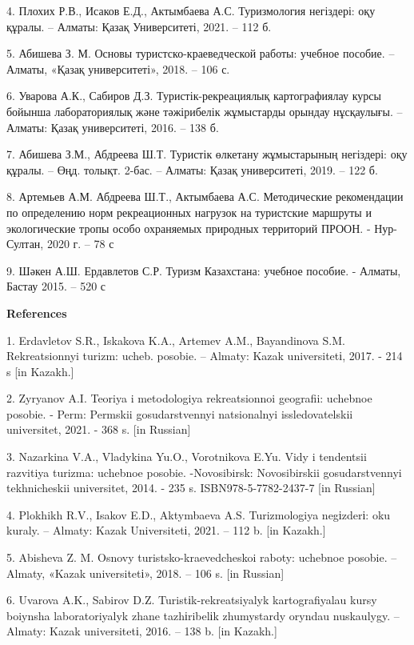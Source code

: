 4. Плохих Р.В., Исаков Е.Д., Актымбаева А.С. Туризмология негіздері: оқу
құралы. -- Алматы: Қазақ Университеті, 2021. -- 112 б.

5. Абишева З. М. Основы туристско-краеведческой работы: учебное пособие.
-- Алматы, «Қазақ университеті», 2018. -- 106 с.

6. Уварова А.К., Сабиров Д.З. Туристік-рекреациялық картографиялау курсы
бойынша лабораториялық және тәжірибелік жұмыстарды орындау нұсқаулығы.
-- Алматы: Қазақ университеті, 2016. -- 138 б.

7. Абишева З.М., Абдреева Ш.Т. Туристік өлкетану жұмыстарының негіздері:
оқу құралы. -- Өңд. толықт. 2-бас. -- Алматы: Қазақ университеті, 2019.
-- 122 б.

8. Артемьев А.М. Абдреева Ш.Т., Актымбаева А.С. Методические
рекомендации по определению норм рекреационных нагрузок на туристские
маршруты и экологические тропы особо охраняемых природных территорий
ПРООН. - Нур-Султан, 2020 г. -- 78 с

9. Шәкен А.Ш. Ердавлетов С.Р. Туризм Казахстана: учебное пособие. -
Алматы, Бастау 2015. -- 520 с

{\bfseries References}

1. Erdavletov S.R., Iskakova K.A., Artem\textquotesingle ev A.M.,
Bayandinova S.M. Rekreatsionnyi turizm: ucheb. posobie. -- Almaty: Kazak
universitetі, 2017. - 214 s {[}in Kazakh.{]}

2. Zyryanov A.I. Teoriya i metodologiya rekreatsionnoi geografii:
uchebnoe posobie. - Perm\textquotesingle: Permskii gosudarstvennyi
natsional\textquotesingle nyi issledovatel\textquotesingle skii
universitet, 2021. - 368 s. {[}in Russian{]}

3. Nazarkina V.A., Vladykina Yu.O., Vorotnikova E.Yu. Vidy i tendentsii
razvitiya turizma: uchebnoe posobie. -Novosibirsk: Novosibirskii
gosudarstvennyi tekhnicheskii universitet, 2014. - 235 s.
ISBN978-5-7782-2437-7 {[}in Russian{]}

4. Plokhikh R.V., Isakov E.D., Aktymbaeva A.S. Turizmologiya negіzderі:
oku kuraly. -- Almaty: Kazak Universitetі, 2021. -- 112 b. {[}in
Kazakh.{]}

5. Abisheva Z. M. Osnovy turistsko-kraevedcheskoi raboty: uchebnoe
posobie. -- Almaty, «Kazak universitetі», 2018. -- 106 s. {[}in
Russian{]}

6. Uvarova A.K., Sabirov D.Z. Turistіk-rekreatsiyalyk kartografiyalau
kursy boiynsha laboratoriyalyk zhane tazhіribelіk zhumystardy oryndau
nuskaulygy. -- Almaty: Kazak universitetі, 2016. -- 138 b. {[}in
Kazakh.{]}

